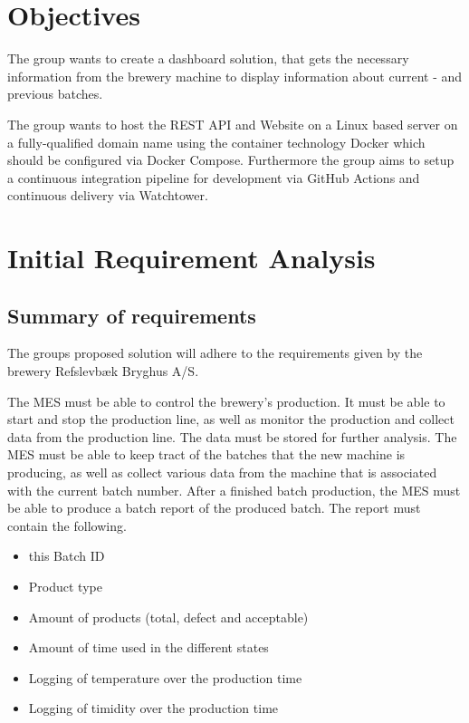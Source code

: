\section{Objectives}
The group wants to create a dashboard solution, that gets the necessary
information from the brewery machine to display information about current - and
previous batches.

The group wants to host the REST API and Website on a Linux based server on a
fully-qualified domain name using the container technology Docker which should
be configured via Docker Compose. Furthermore the group aims to setup a
continuous integration pipeline for development via GitHub Actions and
continuous delivery via Watchtower.

\section{Initial Requirement Analysis}


\subsection{Summary of requirements}
The groups proposed solution will adhere to the requirements given by the brewery Refslevbæk Bryghus A/S.

The MES must be able to control the brewery’s production.
It must be able to start and stop the production line,
as well as monitor the production and collect data from the production line.
The data must be stored for further analysis.
The MES must be able to keep tract of the batches that the new machine is producing,
as well as collect various data from the machine that is associated with the current batch number.
After a finished batch production, the MES must be able to produce a batch report of the produced batch.
The report must contain the following. \\

\begin{itemize}
    \item this Batch ID
    \item Product type
    \item Amount of products (total, defect and acceptable)
    \item Amount of time used in the different states
    \item Logging of temperature over the production time
    \item Logging of timidity over the production time
\end{itemize}

